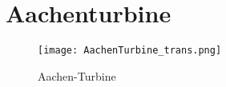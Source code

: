 \chapter{Aachenturbine}
\todo
  \begin{figure}[htbp]
	\centering
	\label{imgAachenTurbine}
	\texttt{[image: AachenTurbine\_trans.png]}
	\caption{Aachen-Turbine}
\end{figure} 





